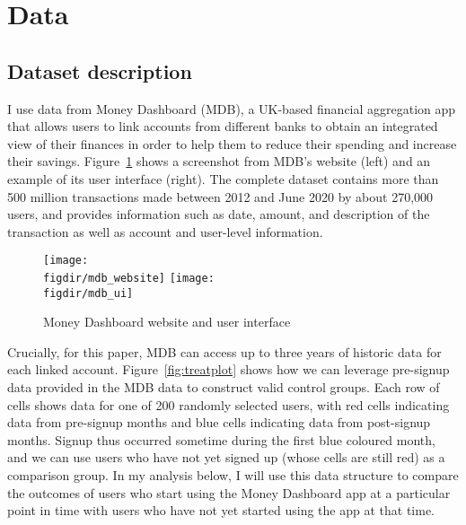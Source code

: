 
\section{Data}%
\label{sec:data}

\subsection{Dataset description}%
\label{sub:dataset_description}

I use data from Money Dashboard (MDB), a UK-based financial aggregation app
that allows users to link accounts from different banks to obtain an integrated
view of their finances in order to help them to reduce their spending and
increase their savings. Figure~\ref{fig:mdb} shows a screenshot from MDB's
website (left) and an example of its user interface (right). The complete
dataset contains more than 500 million transactions made between 2012 and June
2020 by about 270,000 users, and provides information such as date, amount, and
description of the transaction as well as account and user-level information.

\begin{figure}[h]
    \centering
    \caption{Money Dashboard website and user interface}%
    \texttt{[image: \\figdir/mdb\_website]}
    \texttt{[image: \\figdir/mdb\_ui]}
    \label{fig:mdb}
\end{figure}

Crucially, for this paper, MDB can access up to three years of historic data
for each linked account. Figure~\ref{fig:treatplot} shows how we can leverage
pre-signup data provided in the MDB data to construct valid control groups.
Each row of cells shows data for one of 200 randomly selected users, with red
cells indicating data from pre-signup months and blue cells indicating data
from post-signup months. Signup thus occurred sometime during the first blue
coloured month, and we can use users who have not yet signed up (whose cells
are still red) as a comparison group. In my analysis below, I will use this
data structure to compare the outcomes of users who start using the Money
Dashboard app at a particular point in time with users who have not yet started
using the app at that time.


